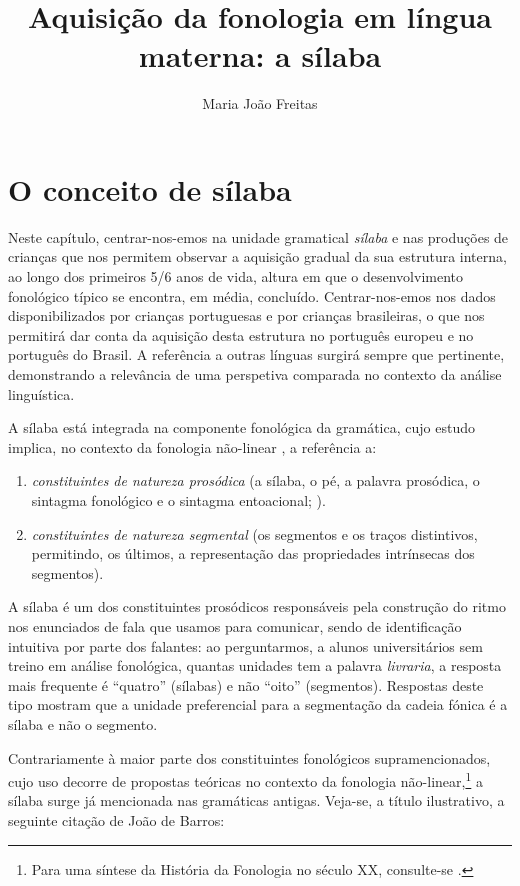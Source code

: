 \documentclass[output=paper]{LSP/langsci}
\author{Maria João Freitas\affiliation{Universidade de Lisboa, Faculdade de Letras, Centro de Linguística}
}
\title{Aquisição da fonologia em língua materna: a sílaba}
\begin{document}
\section{O conceito de sílaba} 
\label{sec:freitas_conceito}

Neste capítulo, centrar-nos-emos na unidade gramatical \textit{sílaba} e nas produções de crianças que nos permitem observar a aquisição gradual da sua estrutura interna, ao longo dos primeiros 5/6 anos de vida, altura em que o desenvolvimento fonológico típico se encontra, em média, concluído. Centrar-nos-emos nos dados disponibilizados por crianças portuguesas e por crianças brasileiras, o que nos permitirá dar conta da aquisição desta estrutura no português europeu e no português do Brasil. A referência a outras línguas surgirá sempre que pertinente, demonstrando a relevância de uma perspetiva comparada no contexto da análise linguística.

A sílaba está integrada na componente fonológica da gramática, cujo estudo implica, no contexto da fonologia não-linear \citep{goldsmith1995,delacy2007}, a referência a:

\begin{enumerate}[label=\alph*)]
\item \textit{constituintes de natureza prosódica} (a sílaba, o pé, a palavra prosódica, o sintagma fonológico e o sintagma entoacional;  \citealt{nesporvogel1986}).
\item \textit{constituintes de natureza segmental} (os segmentos e os traços distintivos, permitindo, os últimos, a representação das propriedades intrínsecas dos segmentos).
\end{enumerate}

A sílaba é um dos constituintes prosódicos responsáveis pela construção do ritmo nos enunciados de fala que usamos para comunicar, sendo de identificação intuitiva por parte dos falantes: ao perguntarmos, a alunos universitários sem treino em análise fonológica, quantas unidades tem a palavra \textit{livraria}, a resposta mais frequente é ``quatro'' (sílabas) e não ``oito'' (segmentos). Respostas deste tipo mostram que a unidade preferencial para a segmentação da cadeia fónica é a sílaba e não o segmento.

Contrariamente à maior parte dos constituintes fonológicos supramencionados, cujo uso decorre de propostas teóricas no contexto da fonologia não-linear,\footnote{Para uma síntese da História da Fonologia no século XX, consulte-se \citealt[capítulo 1]{mateus_etal2005}.} a sílaba surge já mencionada nas gramáticas antigas. Veja-se, a título ilustrativo, a seguinte citação de João de Barros:
\end{document}
